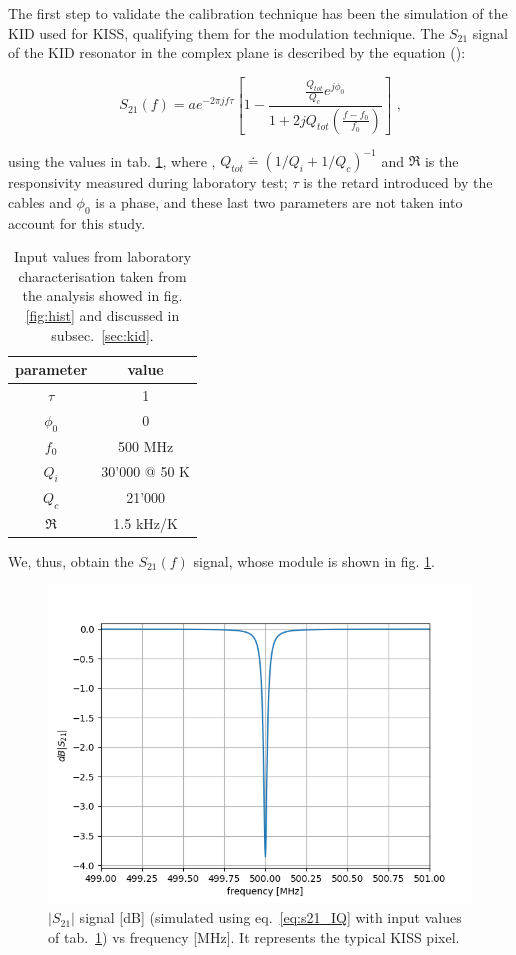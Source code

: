 \documentclass[twocolumn,traditabstract]{aa}\\
\begin{document}
The first step to validate the calibration technique has been the simulation of the KID used for KISS, qualifying them for the modulation technique.
The $S_{21}$ signal of the KID resonator in the complex plane is described by the equation (\cite{Gao}):

\begin{equation}
S_{21}(f)=ae^{-2\pi j f \tau} \left[ 1-\frac{\frac{Q_{tot}}{Q_c}e^{j\phi_0}}{1+2jQ_{tot}\left(\frac{f-f_0}{f_0}\right)}\right] \text{ ,}
\label{eq:s21_IQ}
\end{equation}

\noindent using the values in tab. \ref{tab:s21_values}, where , $Q_{tot}\doteq\left( 1/Q_i + 1/Q_c \right)^{-1}$ and $\mathfrak{R}$ is the responsivity measured during laboratory test; $\tau$ is the retard introduced by the cables and $\phi_0$ is a phase, and these last two parameters are not taken into account for this study.

\begin{table}[htf]
	\footnotesize
	\centering
	\caption{Input values from laboratory characterisation taken from the analysis showed in fig. \ref{fig:hist} and discussed in subsec.~\ref{sec:kid}.}
	\begin{tabular}{cc}
		\toprule
		\textbf{parameter} & \textbf{value} \\
		\toprule
		$\tau$ & 1 \\ 
		\midrule 
		$\phi_0$ & 0 \\
		\midrule
		$f_0$ & 500 MHz \\  
		\midrule 
		$Q_i$ & 30'000 @ 50 K \\ 
		\midrule 
		$Q_c$ & 21'000 \\ 
		\midrule 
		$\mathfrak{R}$  & 1.5 kHz/K \\ 
		\bottomrule
	\end{tabular}
	\label{tab:s21_values}
\end{table}

\noindent We, thus, obtain the $S_{21}(f)$ signal, whose module is shown in fig. \ref{fig:s21_simu}.

\begin{figure}[htf]
	\centering
	\includegraphics[width=.5\textwidth]{3.acqui/resonance.png}
	\caption{$\left|S_{21} \right|$ signal [dB] (simulated using eq.~\ref{eq:s21_IQ} with input values of tab.~\ref{tab:s21_values}) vs frequency [MHz]. It represents the typical KISS pixel. }
	\label{fig:s21_simu}
\end{figure}
\end{document}
